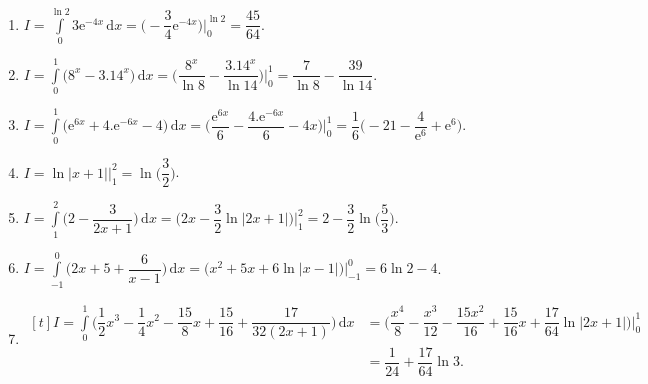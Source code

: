\begin{bt}
{\begin{enumerate}[\indent a.]
				\item $I=\displaystyle\int\limits_0^{\ln 2} 3\mathrm{e}^{-4x}  \,\textrm{d}x=\biggl(-\dfrac{3}{4}\mathrm{e}^{-4x}\biggr)\Biggr|_0^{\ln2}=\dfrac{45}{64}$.
				\item $I=\displaystyle\int\limits_0^1 \bigl(8^x-3.14^x\bigr)\,\textrm{d}x=\biggl(\dfrac{8^x}{\ln8}-\dfrac{3.14^x}{\ln 14}\biggr)\Biggr|_0^1=\dfrac{7}{\ln8}-\dfrac{39}{\ln14}$.
				\item $I=\displaystyle\int\limits_0^1 \bigl(\mathrm{e}^{6x}+4.\mathrm{e}^{-6x}-4)\,\textrm{d}x=\biggl(\dfrac{\mathrm{e}^{6x}}{6}-\dfrac{4.\mathrm{e}^{-6x}}{6}-4x\biggr)\Biggr|_0^1=\dfrac{1}{6}\biggl(-21-\dfrac{4}{\mathrm{e}^6}+\mathrm{e}^6\biggr)$.
				\item $I=\ln|x+1|\biggr|_1^2=\ln\biggl(\dfrac{3}{2}\biggr)$.
				\item $I=\displaystyle\int\limits_1^2 \biggl(2-\dfrac{3}{2x+1}\biggr)\,\textrm{d}x=\biggl(2x-\dfrac{3}{2}\ln|2x+1|\biggr)\Biggr|_1^2=2-\dfrac{3}{2}\ln\biggl(\dfrac{5}{3}\biggr)$.
				\item $I=\displaystyle\int\limits_{-1}^0 \biggl(2x+5+\dfrac{6}{x-1}\biggr)\,\textrm{d}x=\bigl(x^2+5x+6\ln|x-1|\bigr)\biggr|_{-1}^0=6\ln2-4$. 
				\item $\begin{aligned}[t]
				I=\displaystyle\int\limits_0^1 \biggl(\dfrac{1}{2}x^3-\dfrac{1}{4}x^2-\dfrac{15}{8}x+\dfrac{15}{16}+\dfrac{17}{32(2x+1)}\biggr)\,\textrm{d}x &=\biggl(\dfrac{x^4}{8}-\dfrac{x^3}{12}-\dfrac{15x^2}{16}+\dfrac{15}{16}x+\dfrac{17}{64}\ln|2x+1|\biggr)\Biggr|_0^1\\
				&=\dfrac{1}{24}+\dfrac{17}{64}\ln3.
				\end{aligned}$
			\end{enumerate}
		}
	\end{bt}

